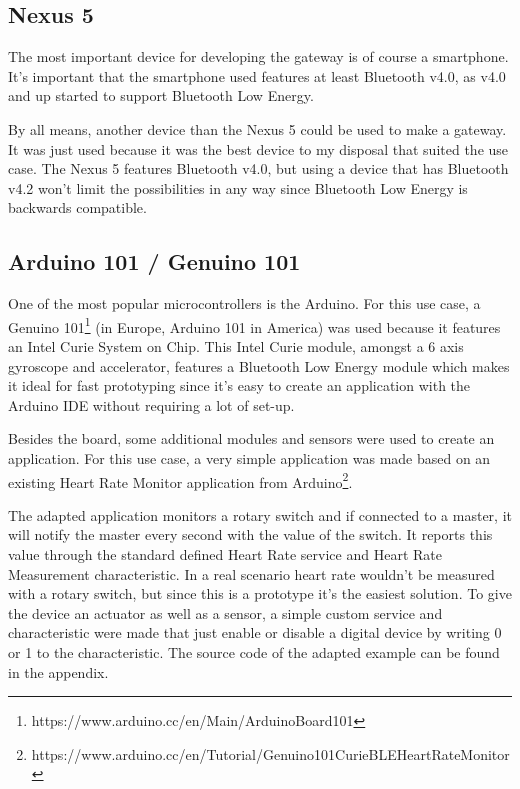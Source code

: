 \documentclass[pdftex,a4paper,12pt,twoside]{report}
\begin{document}
\subsection{Nexus 5}
\label{subsec:nexus}
The most important device for developing the gateway is of course a smartphone. It's important that the smartphone used features at least Bluetooth v4.0, as v4.0 and up started to support Bluetooth Low Energy.

By all means, another device than the Nexus 5 could be used to make a gateway. It was just used because it was the best device to my disposal that suited the use case. The Nexus 5 features Bluetooth v4.0, but using a device that has Bluetooth v4.2 won't limit the possibilities in any way since Bluetooth Low Energy is backwards compatible.

\subsection{Arduino 101 / Genuino 101}
\label{subsec:arduino101}
One of the most popular microcontrollers is the Arduino. For this use case, a Genuino 101\footnote{https://www.arduino.cc/en/Main/ArduinoBoard101} (in Europe, Arduino 101 in America) was used because it features an Intel Curie System on Chip. This Intel Curie module, amongst a 6 axis gyroscope and accelerator, features a Bluetooth Low Energy module which makes it ideal for fast prototyping since it's easy to create an application with the Arduino IDE without requiring a lot of set-up.

Besides the board, some additional modules and sensors were used to create an application. For this use case, a very simple application was made based on an existing Heart Rate Monitor application from Arduino\footnote{https://www.arduino.cc/en/Tutorial/Genuino101CurieBLEHeartRateMonitor}.

The adapted application monitors a rotary switch and if connected to a master, it will notify the master every second with the value of the switch. It reports this value through the standard defined Heart Rate service and Heart Rate Measurement characteristic. In a real scenario heart rate wouldn't be measured with a rotary switch, but since this is a prototype it's the easiest solution. To give the device an actuator as well as a sensor, a simple custom service and characteristic were made that just enable or disable a digital device by writing 0 or 1 to the characteristic. The source code of the adapted example can be found in the appendix.
\end{document}
